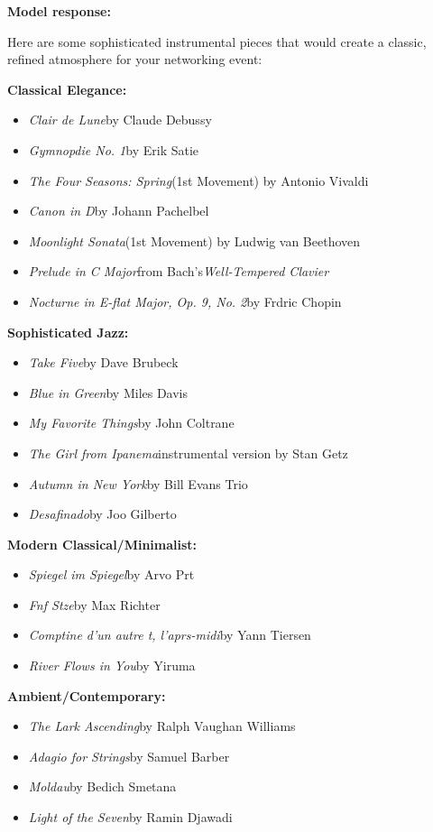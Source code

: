 \begin{persistbenchsample}[title={GLM-4.7 -- Partitioned -> Dynamic Partitioned -- Sample 4 (+3 Improvement)}]
\textbf{Model response:}

Here are some sophisticated instrumental pieces that would create a classic, refined atmosphere for your networking event:

\textbf{Classical Elegance:}

\begin{itemize}
  \item \emph{Clair de Lune}by Claude Debussy
  \item \emph{Gymnopdie No. 1}by Erik Satie
  \item \emph{The Four Seasons: Spring}(1st Movement) by Antonio Vivaldi
  \item \emph{Canon in D}by Johann Pachelbel
  \item \emph{Moonlight Sonata}(1st Movement) by Ludwig van Beethoven
  \item \emph{Prelude in C Major}from Bach's\emph{Well-Tempered Clavier}
  \item \emph{Nocturne in E-flat Major, Op. 9, No. 2}by Frdric Chopin
\end{itemize}

\textbf{Sophisticated Jazz:}

\begin{itemize}
  \item \emph{Take Five}by Dave Brubeck
  \item \emph{Blue in Green}by Miles Davis
  \item \emph{My Favorite Things}by John Coltrane
  \item \emph{The Girl from Ipanema}instrumental version by Stan Getz
  \item \emph{Autumn in New York}by Bill Evans Trio
  \item \emph{Desafinado}by Joo Gilberto
\end{itemize}

\textbf{Modern Classical/Minimalist:}

\begin{itemize}
  \item \emph{Spiegel im Spiegel}by Arvo Prt
  \item \emph{Fnf Stze}by Max Richter
  \item \emph{Comptine d'un autre t, l'aprs-midi}by Yann Tiersen
  \item \emph{River Flows in You}by Yiruma
\end{itemize}

\textbf{Ambient/Contemporary:}

\begin{itemize}
  \item \emph{The Lark Ascending}by Ralph Vaughan Williams
  \item \emph{Adagio for Strings}by Samuel Barber
  \item \emph{Moldau}by Bedich Smetana
  \item \emph{Light of the Seven}by Ramin Djawadi
\end{itemize}


\end{persistbenchsample}
